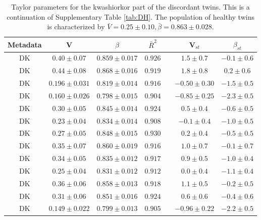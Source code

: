 \documentclass[12pt,oneside,letterpaper]{article}
\begin{document}
\begin{table} 
  \begin{center}
    \begin{tabular}{ccccccc}
	    \hline
		Metadata&V&$\beta$&$\bar{R}^2$&&V$_{st}$&$\beta_{st}$\\
		\hline
		DK&$0.40 \pm 0.07$&$0.859 \pm 0.017$&$0.926$&&$1.5 \pm 0.7$&$-0.1 \pm 0.6$\\
		DK&$0.44 \pm 0.08$&$0.868 \pm 0.016$&$0.919$&&$1.8 \pm 0.8$&$0.2 \pm 0.6$\\
		DK&$0.196 \pm 0.031$&$0.819 \pm 0.014$&$0.916$&&$-0.50 \pm 0.30$&$-1.5 \pm 0.5$\\
		DK&$0.160 \pm 0.026$&$0.798 \pm 0.015$&$0.904$&&$-0.85 \pm 0.25$&$-2.3 \pm 0.5$\\
		DK&$0.30 \pm 0.05$&$0.845 \pm 0.014$&$0.924$&&$0.5 \pm 0.4$&$-0.6 \pm 0.5$\\
		DK&$0.23 \pm 0.04$&$0.834 \pm 0.014$&$0.908$&&$-0.1 \pm 0.4$&$-1.0 \pm 0.5$\\
		DK&$0.27 \pm 0.05$&$0.848 \pm 0.015$&$0.930$&&$0.2 \pm 0.4$&$-0.5 \pm 0.5$\\
		DK&$0.35 \pm 0.07$&$0.860 \pm 0.019$&$0.916$&&$1.0 \pm 0.7$&$-0.1 \pm 0.7$\\
		DK&$0.34 \pm 0.05$&$0.835 \pm 0.012$&$0.917$&&$0.9 \pm 0.5$&$-1.0 \pm 0.4$\\
		DK&$0.25 \pm 0.04$&$0.831 \pm 0.012$&$0.912$&&$0.0 \pm 0.4$&$-1.1 \pm 0.4$\\
		DK&$0.36 \pm 0.06$&$0.858 \pm 0.013$&$0.918$&&$1.1 \pm 0.5$&$-0.2 \pm 0.5$\\
		DK&$0.31 \pm 0.06$&$0.851 \pm 0.016$&$0.924$&&$0.6 \pm 0.6$&$-0.4 \pm 0.6$\\
		DK&$0.149 \pm 0.022$&$0.799 \pm 0.013$&$0.905$&&$-0.96 \pm 0.22$&$-2.2 \pm 0.5$\\
	    \hline
	    \hline
    \end{tabular}
  \end{center}
  \caption{Taylor parameters for the kwashiorkor part of the discordant twins\cite{kwashiorkor}. This is a continuation of Supplementary Table \ref{tab:DH}. The population of healthy twins is characterized by $\bar{V} = 0.25 \pm 0.10, \bar{\beta} = 0.863 \pm 0.028$.}
  \label{tab:DK}
\end{table}
\end{document}
